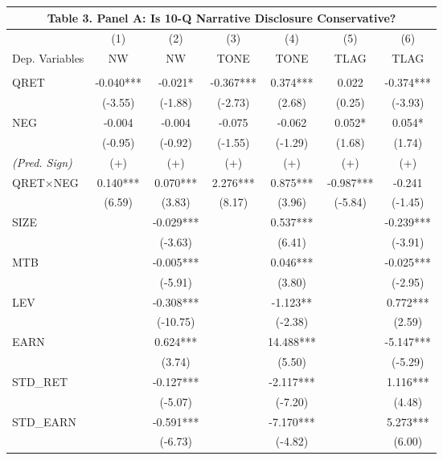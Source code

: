 \begin{table}[H] \label{T3PA}
	\begin{center}
		\begin{tabular}{lcccccc}
			\multicolumn{7}{c}{\textbf{Table 3. Panel A: Is 10-Q Narrative Disclosure Conservative?}} \\
			\toprule
			\toprule
			& (1) & (2) & (3) & (4) & (5) & (6) \\
			Dep. Variables & NW & NW & TONE & TONE & TLAG & TLAG \\
			\midrule
			&   &   &   &   &   &  \\
			QRET & -0.040*** & -0.021* & -0.367*** & 0.374*** & 0.022 & -0.374*** \\
			& (-3.55) & (-1.88) & (-2.73) & (2.68) & (0.25) & (-3.93) \\
			NEG & -0.004 & -0.004 & -0.075 & -0.062 & 0.052* & 0.054* \\
			& (-0.95) & (-0.92) & (-1.55) & (-1.29) & (1.68) & (1.74) \\
			\rowcolor[rgb]{ .933,  .925,  .882} \textit{(Pred. Sign)} & (+) & (+) & (+) & (+) & (+) & (+) \\
			\rowcolor[rgb]{ .933,  .925,  .882} QRET$\times$NEG & 0.140*** & 0.070*** & 2.276*** & 0.875*** & -0.987*** & -0.241 \\
			\rowcolor[rgb]{ .933,  .925,  .882}   & (6.59) & (3.83) & (8.17) & (3.96) & (-5.84) & (-1.45) \\
			SIZE &  & -0.029*** &   & 0.537*** &   & -0.239*** \\
			&   & (-3.63) &   & (6.41) &   & (-3.91) \\
			MTB &   & -0.005*** &   & 0.046*** &   & -0.025*** \\
			&   & (-5.91) &   & (3.80) &   & (-2.95) \\
			LEV &   & -0.308*** &   & -1.123** &   & 0.772*** \\
			&   & (-10.75) &   & (-2.38) &   & (2.59) \\
			EARN &   & 0.624*** &   & 14.488*** &   & -5.147*** \\
			&   & (3.74) &   & (5.50) &   & (-5.29) \\
			STD\_RET &   & -0.127*** &   & -2.117*** &   & 1.116*** \\
			&   & (-5.07) &   & (-7.20) &   & (4.48) \\
			STD\_EARN &   & -0.591*** &   & -7.170*** &   & 5.273*** \\
			&   & (-6.73) &   & (-4.82) &   & (6.00) \\

\end{tabular}
\end{center}
\end{table}
